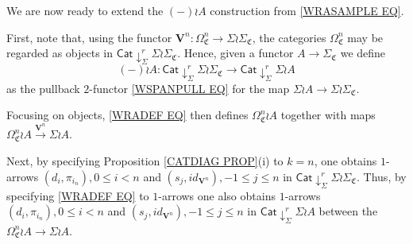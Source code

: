 \documentclass[a4paper,10pt
,draft
]{article}%
\numberwithin{equation}{section}
\numberwithin{figure}{section}
\theoremstyle{definition} %
\newcommand{\1}{\ensuremath{\mathbbm 1}}%
\begin{document}






\vskip 10pt


We are now ready to extend the $(-) \wr A$
construction from \eqref{WRASAMPLE EQ}.

First, note that, using the functor
$\boldsymbol{V}^n \colon \Omega^n_{\mathfrak{C}} \to \Sigma \wr \Sigma_{\mathfrak{C}}$,
the categories 
$\Omega^n_{\mathfrak{C}}$ may be regarded as objects in
$\mathsf{Cat} \downarrow^r_{\Sigma} \Sigma \wr \Sigma_{\mathfrak{C}}$.
Hence, given a functor $A \to \Sigma_{\mathfrak{C}}$
we define 
\begin{equation}\label{WRADEF EQ}
(-) \wr A \colon 
\mathsf{Cat} \downarrow^r_{\Sigma} \Sigma \wr \Sigma_{\mathfrak{C}}
\to
\mathsf{Cat} \downarrow^r_{\Sigma} \Sigma \wr A
\end{equation}
as the pullback $2$-functor \eqref{WSPANPULL EQ} for the map
$\Sigma \wr A \to \Sigma \wr \Sigma_{\mathfrak{C}}$.



Focusing on objects, \eqref{WRADEF EQ} then defines 
$\Omega_{\mathfrak{C}}^n \wr A$
together with maps 
$\Omega_{\mathfrak{C}}^n \wr A 
\xrightarrow{\boldsymbol{V}^n} \Sigma \wr A$.

Next, by specifying Proposition \ref{CATDIAG PROP}(i) to $k=n$,
one obtains $1$-arrows 
$(d_i,\pi_{i_n}), 0 \leq i < n$ and 
$(s_j,id_{\boldsymbol{V}^n}), -1 \leq j \leq n$
in 
$\mathsf{Cat} \downarrow^r_{\Sigma} \Sigma \wr \Sigma_{\mathfrak{C}}$.
Thus, by specifying \eqref{WRADEF EQ} to $1$-arrows
one also obtains $1$-arrows
$(d_i,\pi_{i_n}), 0 \leq i < n$ and 
$(s_j,id_{\boldsymbol{V}^n}), -1 \leq j \leq n$
in $\mathsf{Cat} \downarrow^r_{\Sigma} \Sigma \wr A$
between the $\Omega_{\mathfrak{C}}^n \wr A \to \Sigma \wr A$.
\end{document}

